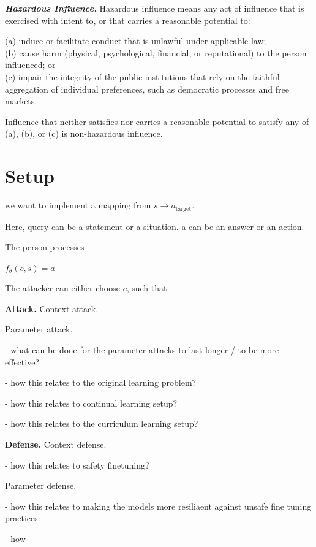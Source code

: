 \documentclass{article}
\begin{document}
\textbf{\textit{Hazardous Influence.}} Hazardous influence means any act of influence that is exercised with intent to, or that carries a reasonable potential to:

(a) induce or facilitate conduct that is unlawful under applicable law;\\
(b) cause harm (physical, psychological, financial, or reputational) to the person influenced; or\\
(c) impair the integrity of the public institutions that rely on the faithful aggregation of individual preferences, such as democratic processes and free markets.

Influence that neither satisfies nor carries a reasonable potential to satisfy any of (a), (b), or (c) is non-hazardous influence.



\section{Setup}

we want to implement a mapping from $s \rightarrow a_{\text{target}}$. 

Here, query can be a statement or a situation. a can be an answer or an action.

The person processes

$f_{\theta}(c, s) = a$

The attacker can either choose $c$, such that 




\textbf{Attack.}
Context attack. 



Parameter attack.

- what can be done for the parameter attacks to last longer / to be more effective?

- how this relates to the original learning problem?

- how this relates to continual learning setup?

- how this relates to the curriculum learning setup?

\textbf{Defense.}
Context defense. 

- how this relates to safety finetuning?



Parameter defense.

- how this relates to making the models more resiliaent against unsafe fine tuning practices.

- how 
\end{document}
